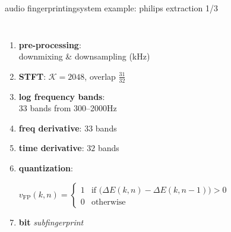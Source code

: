         \begin{frame}{audio fingerprinting}{system example: philips extraction 1/3}
            \begin{footnotesize}
                \begin{columns}[T]
                        \scalebox{.75}
                        {
                            \centering
                            
                        }
                        \begin{enumerate}
                            \item<1->	\textbf{pre-processing}:\\ downmixing \& downsampling (\unit[5]{kHz})
                            \item<2->	\textbf{STFT}: $\mathcal{K}=2048$, overlap $\frac{31}{32}$
                            \item<3->	\textbf{log frequency bands}:\\ $33$ bands from 300--2000\unit{Hz}
                            \item<4->	\textbf{freq derivative}: $33$ bands
                            \item<4->	\textbf{time derivative}: $32$ bands
                            \item<5->	\textbf{quantization}: 
                                \begin{tiny}
                                    \begin{equation*}\label{eq:fingerprint}
                                        v_\mathrm{FP}(k,n)	= \begin{cases}
                                                        1 & \text{if } \big(\Delta{E}(k,n) - \Delta{E}(k,n-1)\big) > 0\\
                                                        0 & \text{otherwise}
                                                    \end{cases}\nonumber
                                    \end{equation*}
                                \end{tiny}

                            \item<6->[$\Rightarrow$]	\textbf{\unit[32]{bit}} \textit{subfingerprint}
                        \end{enumerate}
                \end{columns}
            \end{footnotesize}
        \end{frame}

